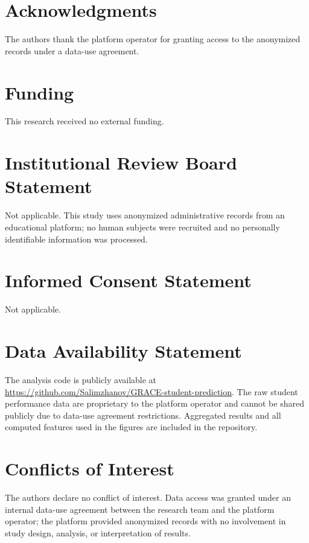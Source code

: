\documentclass[11pt]{article}
\begin{document}
\section*{Acknowledgments}
The authors thank the platform operator for granting access to the anonymized records
under a data-use agreement.

\section*{Funding}
This research received no external funding.

\section*{Institutional Review Board Statement}
Not applicable. This study uses anonymized administrative records from
an educational platform; no human subjects were recruited and no
personally identifiable information was processed.

\section*{Informed Consent Statement}
Not applicable.

\section*{Data Availability Statement}
\begin{sloppypar}
The analysis code is publicly available at \url{https://github.com/Salimzhanov/GRACE-student-prediction}.
The raw student performance data are proprietary to the platform operator and cannot be shared publicly due to
data-use agreement restrictions. Aggregated results and all computed
features used in the figures are included in the repository.
\end{sloppypar}

\section*{Conflicts of Interest}
The authors declare no conflict of interest.
Data access was granted under an internal data-use agreement between the research team
and the platform operator; the platform provided anonymized records with no involvement
in study design, analysis, or interpretation of results.

\end{document}
